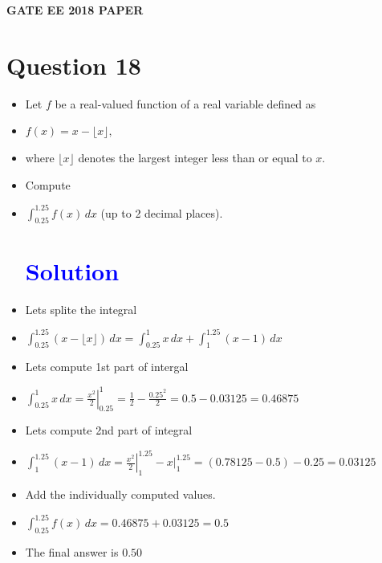 \documentclass{article}
\date{\today}
\begin{document}
\thispagestyle{fancy}
\fancyhf{}
\renewcommand{\headrulewidth}{0.4pt}
\fancyfoot[c]{\thepage}
\vspace*{0.1cm}
\begin{center}
\textbf{\Huge GATE EE 2018  PAPER}
\end{center}
\section*{Question 18}
\begin{itemize}[label={},leftmargin=0pt]
\item Let $f$ be a real-valued function of a real variable defined as
\item $f(x) = x - \lfloor x \rfloor,$
\item where $\lfloor x \rfloor$ denotes the largest integer less than or equal to $x$.  
\item Compute
\item $\int_{0.25}^{1.25} f(x)\, dx$ (up to 2 decimal places).
\section*{\textcolor{blue}{Solution}}
    \item Lets splite the integral
    \item  $\int_{0.25}^{1.25} (x - \lfloor x \rfloor) \, dx = \int_{0.25}^{1} x \, dx + \int_{1}^{1.25} (x - 1) \, dx$
    \item Lets compute 1st part of intergal
    \item $\int_{0.25}^{1} x \, dx = \left. \frac{x^2}{2} \right|_{0.25}^{1} = \frac{1}{2} - \frac{0.25^2}{2} = 0.5 - 0.03125 = 0.46875$
    \item Lets compute 2nd part of integral
    \item $\int_{1}^{1.25} (x - 1) \, dx = \left. \frac{x^2}{2} \right|_{1}^{1.25} - \left. x \right|_{1}^{1.25} = (0.78125 - 0.5) - 0.25 = 0.03125$
    \item Add the individually computed values.
    \item $\int_{0.25}^{1.25} f(x) \, dx = 0.46875 + 0.03125 = 0.5$
    \item The final answer is $\boxed{0.50}$
\end{itemize}
\end{document}
